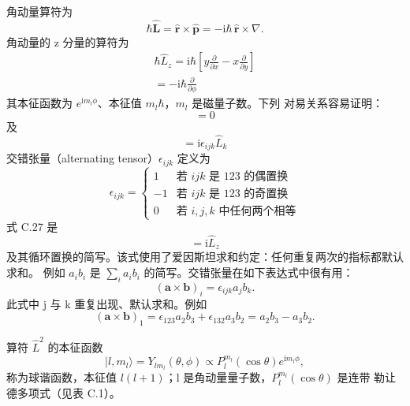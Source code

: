 角动量算符为
\begin{equation*}
\hbar\hat{\mathbf{L}} = \hat{\mathbf{r}}\times\hat{\mathbf{p}} = -\mathrm{i}\hbar\,\hat{\mathbf{r}}\times\nabla.\tag{C.23}
\end{equation*}
角动量的 z 分量的算符为
\begin{align*}
\hbar\hat{L}_z = \mathrm{i}\hbar\left[y\frac{\partial}{\partial x} - x\frac{\partial}{\partial y}\right]\tag{C.24}\\
= -\mathrm{i}\hbar\frac{\partial}{\partial\phi}\tag{C.25}
\end{align*}
其本征函数为 $e^{\mathrm{i}m_l\phi}$、本征值 $m_l\hbar$，$m_l$ 是磁量子数。下列
对易关系容易证明：
\begin{equation*}
[\hat{L}_i, \hat{L}^{2}] = 0\tag{C.26}
\end{equation*}
及
\begin{equation*}
[\hat{L}_i, \hat{L}_j] = \mathrm{i}\epsilon_{ijk}\hat{L}_k\tag{C.27}
\end{equation*}
交错张量（alternating tensor）$\epsilon_{ijk}$ 定义为
\begin{equation*}
\epsilon_{ijk} = \begin{cases} 1 & \text{若 } ijk \text{ 是 123 的偶置换}\\ -1 & \text{若 } ijk \text{ 是 123 的奇置换}\\ 0 & \text{若 } i, j, k \text{ 中任何两个相等} \end{cases}\tag{C.28}
\end{equation*}
式 C.27 是
\begin{equation*}
[\hat{L}_x, \hat{L}_y] = \mathrm{i}\hat{L}_z
\end{equation*}
及其循环置换的简写。该式使用了爱因斯坦求和约定：任何重复两次的指标都默认求和。
例如 $a_ib_i$ 是 $\sum_ia_ib_i$ 的简写。交错张量在如下表达式中很有用：
\begin{equation*}
(\mathbf{a}\times\mathbf{b})_i = \epsilon_{ijk}a_jb_k.
\end{equation*}
此式中 j 与 k 重复出现、默认求和。例如
\begin{equation*}
(\mathbf{a}\times\mathbf{b})_1 = \epsilon_{123}a_2b_3+\epsilon_{132}a_3b_2 = a_2b_3-a_3b_2.
\end{equation*}

算符 $\hat{L}^{2}$ 的本征函数
\begin{equation*}
|l, m_l\rangle = Y_{lm_l}(\theta,\phi) \propto P_l^{m_l}(\cos\theta)e^{\mathrm{i}m_l\phi},\tag{C.29}
\end{equation*}
称为球谐函数，本征值 $l(l+1)$；l 是角动量量子数，$P_l^{m_l}(\cos\theta)$ 是连带
勒让德多项式（见表 C.1）。

